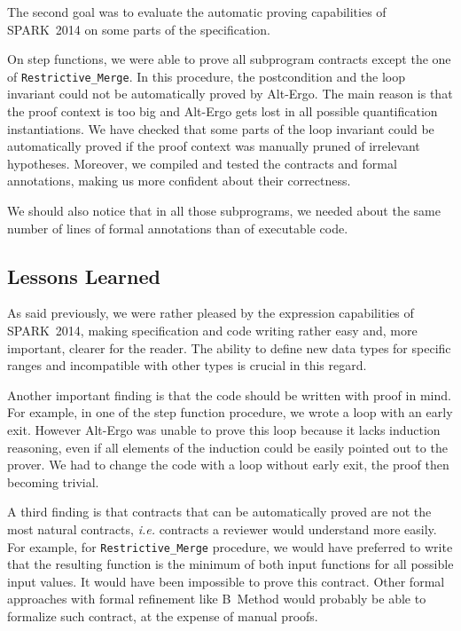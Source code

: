 \documentclass[10pt,a4paper,twocolumn]{article}
\newcommand{\newspark}{SPARK~2014\xspace}
\newcommand{\altergo}{Alt-Ergo\xspace}
\newcommand{\ie}{\textit{i.e.}\xspace}
\newcommand{\SPARK}[1]{\lstinline[language=Ada,basicstyle={\footnotesize
      \sffamily},framesep=0pt]$#1$}
\begin{document}
The second goal was to evaluate the automatic proving capabilities of \newspark
on some parts of the specification.

On step functions, we were able to prove all subprogram
contracts except the one of \SPARK{Restrictive_Merge}. In this procedure, the
postcondition and the loop invariant could not be automatically
proved by \altergo. The main reason is that the proof context is too
big and \altergo gets lost in all possible quantification
instantiations. We have checked that some parts of the loop invariant
could be automatically proved if the proof context was manually pruned
of irrelevant hypotheses. Moreover, we compiled and tested the
contracts and formal annotations, making us more confident about their
correctness.

We should also notice that in all those subprograms, we needed about
the same number of lines of formal annotations than of executable
code.

\subsection{Lessons Learned}

As said previously, we were rather pleased by the expression
capabilities of \newspark, making specification and code writing
rather easy and, more important, clearer for the reader. The ability
to define new data types for specific ranges and incompatible with
other types is crucial in this regard.

Another important finding is that the code should be written with
proof in mind. For example, in one of the step function procedure, we
wrote a loop with an early exit. However \altergo was unable to prove
this loop because it lacks induction reasoning, even if all elements
of the induction could be easily pointed out to the prover. We had to
change the code with a loop without early exit, the proof then
becoming trivial.

A third finding is that contracts that can be automatically proved are
not the most natural contracts, \ie contracts a reviewer would
understand more easily. For example, for \SPARK{Restrictive_Merge}
procedure, we would have preferred to write that the resulting function
is the minimum of both input functions for all possible input
values. It would have been impossible to prove this contract. Other
formal approaches with formal refinement like B~Method would probably
be able to formalize such contract, at the expense of manual proofs.
\end{document}
